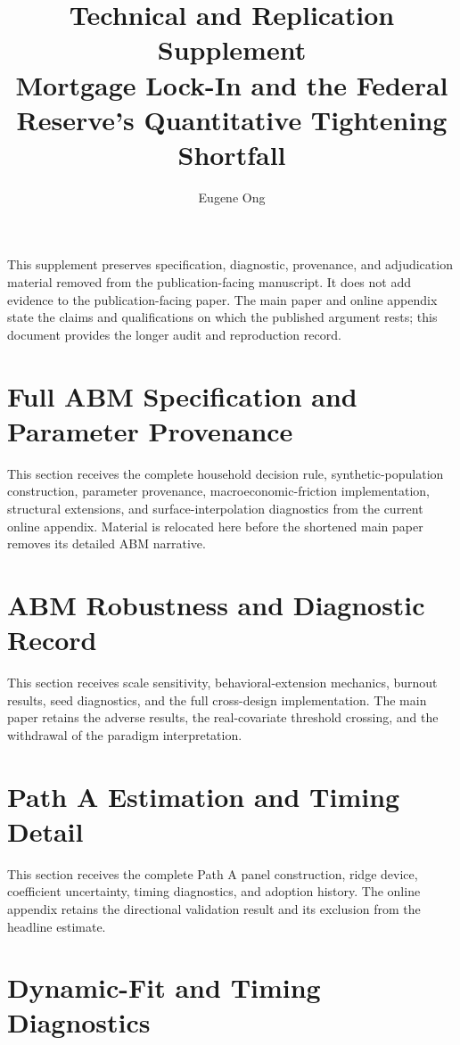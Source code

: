 \documentclass[12pt]{article}
\title{Technical and Replication Supplement\\
\large Mortgage Lock-In and the Federal Reserve's Quantitative Tightening Shortfall}
\author{Eugene Ong}
\date{}
\begin{document}
\maketitle

\noindent This supplement preserves specification, diagnostic, provenance, and
adjudication material removed from the publication-facing manuscript. It does not add evidence to the publication-facing paper. The main paper and online
appendix state the claims and qualifications on which the published argument
rests; this document provides the longer audit and reproduction record.

\tableofcontents
\clearpage

\section{Full ABM Specification and Parameter Provenance}\label{supp:abm-specification}

This section receives the complete household decision rule, synthetic-population
construction, parameter provenance, macroeconomic-friction implementation,
structural extensions, and surface-interpolation diagnostics from the current
online appendix. Material is relocated here before the shortened main paper
removes its detailed ABM narrative.

\section{ABM Robustness and Diagnostic Record}\label{supp:abm-diagnostics}

This section receives scale sensitivity, behavioral-extension mechanics,
burnout results, seed diagnostics, and the full cross-design implementation.
The main paper retains the adverse results, the real-covariate threshold
crossing, and the withdrawal of the paradigm interpretation.

\section{Path A Estimation and Timing Detail}\label{supp:patha}

This section receives the complete Path A panel construction, ridge device,
coefficient uncertainty, timing diagnostics, and adoption history. The online
appendix retains the directional validation result and its exclusion from the
headline estimate.

\section{Dynamic-Fit and Timing Diagnostics}\label{supp:timing}
\end{document}
